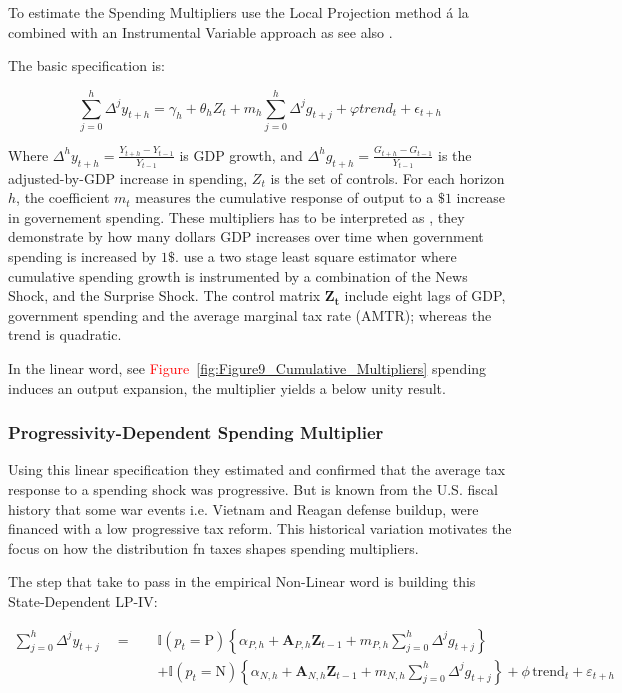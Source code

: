 \documentclass[12pt,letterpaper]{article}
\begin{document}
To estimate the Spending Multipliers \cite{FN} use the Local Projection method á la \cite{Jordà2005} combined with an Instrumental Variable approach as \cite{RameyZubairy2018} see also \cite{JordàTaylo2025LP-IV}.

The basic specification is:

\begin{equation}
    \sum^{h}_{j=0} \Delta^j y_{t+h} = \gamma_h + \theta_hZ_t + m_h\sum^{h}_{j=0}\Delta^jg_{t+j} + \varphi trend_t + \epsilon_{t+h}
\end{equation}

Where $\Delta^hy_{t+h} = \frac{Y_{t+h}-Y_{t-1}}{Y_{t-1}}$ is GDP growth, and $\Delta^hg_{t+h} = \frac{G_{t+h}-G_{t-1}}{Y_{t-1}}$ is the adjusted-by-GDP increase in spending, $Z_t$ is the set of controls.
For each horizon $h$, the coefficient $m_t$ measures the cumulative response of output to a $\$1$ increase in governement spending. 
These multipliers has to be interpreted as \cite{Auerbach_Gorodnichenko_2012_Measuring}, they demonstrate by how many dollars GDP increases over time when government spending is increased by $1\$$. 
\cite{FN} use a two stage least square estimator where cumulative spending growth is instrumented by a combination of the \cite{RameyZubairy2018} News Shock, and the \cite{BP} Surprise Shock.
The control matrix $\bm{Z_t}$ include eight lags of GDP, government spending and the average marginal tax rate (AMTR); whereas the trend is quadratic.

In the \cite{FN} linear word, see \textcolor{red}{Figure~\ref{fig:Figure9_Cumulative_Multipliers}} spending induces an output expansion, the multiplier yields a below unity result.


\subsubsection{Progressivity-Dependent Spending Multiplier}

Using this linear specification they estimated and confirmed that the average tax response to a spending shock was progressive.
But is known from the U.S. fiscal history that some war events i.e. Vietnam and Reagan defense buildup, were financed with a low progressive tax reform. 
This historical variation motivates
the focus on how the distribution fn taxes shapes spending multipliers.

The step that \cite{FN} take to pass in the empirical Non-Linear word is building this State-Dependent LP-IV:

\begin{equation}
    \begin{split}
        \sum_{j=0}^{h} \Delta^j y_{t+j} \quad = \quad & \mathbb{I}(p_t = \text{P}) \left\{ \alpha_{P,h} + \bm{A}_{P,h} \bm{Z}_{t-1} + m_{P,h} \sum_{j=0}^{h} \Delta^j g_{t+j} \right\} \\
        & + \mathbb{I}(p_t = \text{N}) \left\{ \alpha_{N,h} + \bm{A}_{N,h} \bm{Z}_{t-1} + m_{N,h} \sum_{j=0}^{h} \Delta^j g_{t+j} \right\} + \phi \, \text{trend}_t + \varepsilon_{t+h}
    \end{split} 
    \label{eq:LP-IV_FN_Model}
\end{equation}
\end{document}
